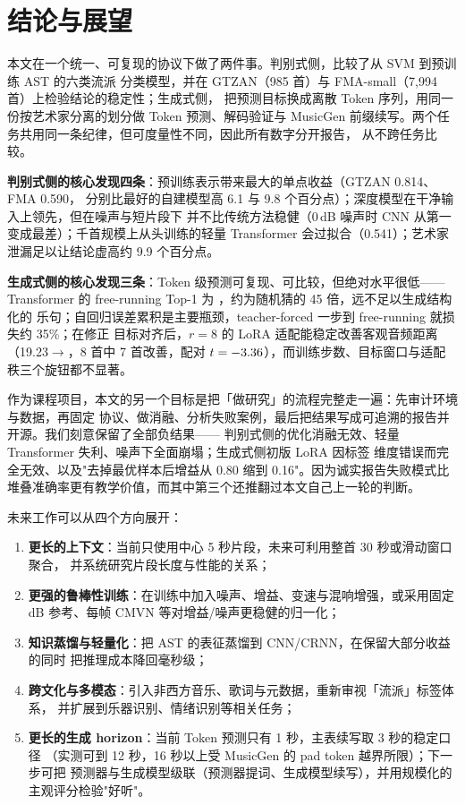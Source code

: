 \documentclass[UTF8,10pt,a4paper]{ctexart}
\begin{document}
\section{结论与展望}\label{sec:conclusion}

本文在一个统一、可复现的协议下做了两件事。判别式侧，比较了从 SVM 到预训练 AST 的六类流派
分类模型，并在 GTZAN（985 首）与 FMA-small（7,994 首）上检验结论的稳定性；生成式侧，
把预测目标换成离散 Token 序列，用同一份按艺术家分离的划分做 Token 预测、解码验证与
MusicGen 前缀续写。两个任务共用同一条纪律，但可度量性不同，因此所有数字分开报告，
从不跨任务比较。

\textbf{判别式侧的核心发现四条}：预训练表示带来最大的单点收益（GTZAN 0.814、FMA 0.590，
分别比最好的自建模型高 6.1 与 9.8 个百分点）；深度模型在干净输入上领先，但在噪声与短片段下
并不比传统方法稳健（0\,dB 噪声时 CNN 从第一变成最差）；千首规模上从头训练的轻量
Transformer 会过拟合（0.541）；艺术家泄漏足以让结论虚高约 9.9 个百分点。

\textbf{生成式侧的核心发现三条}：Token 级预测可复现、可比较，但绝对水平很低——Transformer
的 free-running Top-1 为 \TokTransformerFree{}，约为随机猜的 45 倍，远不足以生成结构化的
乐句；自回归误差累积是主要瓶颈，teacher-forced 一步到 free-running 就损失约 35\%；在修正
目标对齐后，$r{=}8$ 的 LoRA 适配能稳定改善客观音频距离（19.23$\to$\GenFtRmse{}，8 首中
7 首改善，配对 $t=-3.36$），而训练步数、目标窗口与适配秩三个旋钮都不显著。

作为课程项目，本文的另一个目标是把「做研究」的流程完整走一遍：先审计环境与数据，再固定
协议、做消融、分析失败案例，最后把结果写成可追溯的报告并开源。我们刻意保留了全部负结果——
判别式侧的优化消融无效、轻量 Transformer 失利、噪声下全面崩塌；生成式侧初版 LoRA 因标签
维度错误而完全无效、以及"去掉最优样本后增益从 0.80 缩到 0.16"。因为诚实报告失败模式比
堆叠准确率更有教学价值，而其中第三个还推翻过本文自己上一轮的判断。

未来工作可以从四个方向展开：
\begin{enumerate}
  \item \textbf{更长的上下文}：当前只使用中心 5 秒片段，未来可利用整首 30 秒或滑动窗口聚合，
  并系统研究片段长度与性能的关系；
  \item \textbf{更强的鲁棒性训练}：在训练中加入噪声、增益、变速与混响增强，或采用固定 dB
  参考、每帧 CMVN 等对增益/噪声更稳健的归一化；
  \item \textbf{知识蒸馏与轻量化}：把 AST 的表征蒸馏到 CNN/CRNN，在保留大部分收益的同时
  把推理成本降回毫秒级；
  \item \textbf{跨文化与多模态}：引入非西方音乐、歌词与元数据，重新审视「流派」标签体系，
  并扩展到乐器识别、情绪识别等相关任务；
  \item \textbf{更长的生成 horizon}：当前 Token 预测只有 1 秒，主表续写取 3 秒的稳定口径
  （实测可到 12 秒，16 秒以上受 MusicGen 的 pad token 越界所限）；下一步可把
  预测器与生成模型级联（预测器提词、生成模型续写），并用规模化的主观评分检验"好听"。
\end{enumerate}
\end{document}
